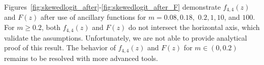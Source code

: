 \documentclass[12pt]{TD-CJS}
\begin{document}
Figures~\ref{fig:skewedlogit_after}-\ref{fig:skewedlogit_after_F} demonstrate $f_{4,4}(z)$ and $F(z)$ after use of ancillary functions for $m = 0.08, 0.18,$ $ 0.2, 1, 10$, and $100$. For $m\ge0.2$, both $f_{4,4}(z)$ and $F(z)$ do not intersect the horizontal axis, which validate the assumptions.
Unfortunately, we are not able to provide analytical proof of this result. The behavior of $f_{4,4}(z)$ and $F(z)$ for $m\in(0,0.2)$ remains to be resolved with more advanced tools. 


\end{document}
